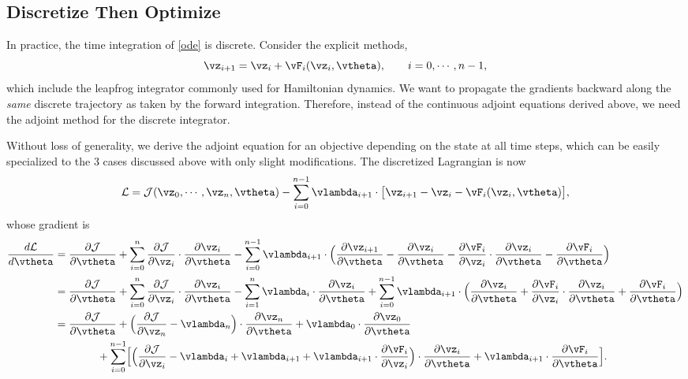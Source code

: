 \documentclass[modern, trackchanges, dvipsnames]{aastex631}
\renewcommand{\d}{d}
\newcommand{\p}{\partial}
\newcommand{\cJ}{\mathcal{J}}
\newcommand{\cL}{\mathcal{L}}
\begin{document}
\vspace{1em}
\subsection{Discretize Then Optimize}

In practice, the time integration of \eqref{ode} is discrete.
Consider the explicit methods,
%
\begin{equation}
\vz_{i+1} = \vz_i + \vF_i(\vz_i, \vtheta), \qquad i = 0, \cdots, n-1,
\label{explicit}
\end{equation}
%
which include the leapfrog integrator commonly used for Hamiltonian
dynamics.
We want to propagate the gradients backward along the \emph{same}
discrete trajectory as taken by the forward integration.
Therefore, instead of the continuous adjoint equations derived above, we
need the adjoint method for the discrete integrator.

Without loss of generality, we derive the adjoint equation for an
objective depending on the state at all time steps, which can be easily
specialized to the 3 cases discussed above with only slight
modifications.
The discretized Lagrangian is now
%
\begin{equation}
\cL = \cJ(\vz_0, \cdots, \vz_n, \vtheta)
- \sum_{i=0}^{n-1} \vlambda_{i+1}
  \cdot \bigl[ \vz_{i+1} - \vz_i - \vF_i(\vz_i, \vtheta) \bigr],
\end{equation}
%
whose gradient is
%
\begin{align}
\frac{\d\cL}{\d\vtheta}
&= \frac{\p\cJ}{\p\vtheta}
+ \sum_{i=0}^n \frac{\p\cJ}{\p\vz_i} \cdot \frac{\p\vz_i}{\p\vtheta}
- \sum_{i=0}^{n-1} \vlambda_{i+1}
  \cdot \Bigl( \frac{\p\vz_{i+1}}{\p\vtheta} - \frac{\p\vz_i}{\p\vtheta}
    - \frac{\p\vF_i}{\p\vz_i} \cdot \frac{\p\vz_i}{\p\vtheta}
    - \frac{\p\vF_i}{\p\vtheta} \Bigr) \nonumber\\
%
&= \frac{\p\cJ}{\p\vtheta}
+ \sum_{i=0}^n \frac{\p\cJ}{\p\vz_i} \cdot \frac{\p\vz_i}{\p\vtheta}
- \sum_{i=1}^n \vlambda_i \cdot \frac{\p\vz_i}{\p\vtheta}
+ \sum_{i=0}^{n-1} \vlambda_{i+1}
  \cdot \Bigl( \frac{\p\vz_i}{\p\vtheta}
    + \frac{\p\vF_i}{\p\vz_i} \cdot \frac{\p\vz_i}{\p\vtheta}
    + \frac{\p\vF_i}{\p\vtheta} \Bigr) \nonumber\\
&= \frac{\p\cJ}{\p\vtheta}
+ \Bigl( \frac{\p\cJ}{\p\vz_n} - \vlambda_n \Bigr)
  \cdot \frac{\p\vz_n}{\p\vtheta}
+ \vlambda_0 \cdot \frac{\p\vz_0}{\p\vtheta} \nonumber\\
&\hspace{4em} + \sum_{i=0}^{n-1} \Bigl[
  \Bigl( \frac{\p\cJ}{\p\vz_i} - \vlambda_i + \vlambda_{i+1}
    + \vlambda_{i+1} \cdot \frac{\p\vF_i}{\p\vz_i} \Bigr)
  \cdot \frac{\p\vz_i}{\p\vtheta}
  + \vlambda_{i+1} \cdot \frac{\p\vF_i}{\p\vtheta} \Bigr].
\end{align}
\end{document}
